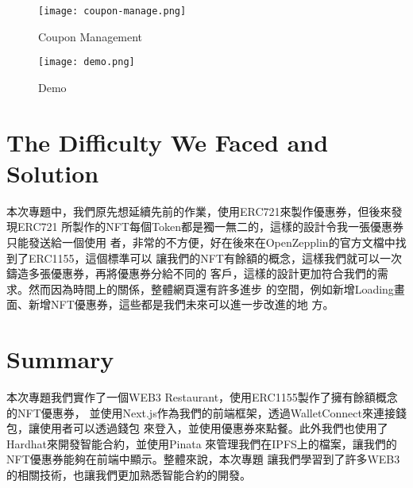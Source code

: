 \begin{figure}[H]
  \centering
  \texttt{[image: coupon-manage.png]}
  \caption{Coupon Management}
  \label{fig:coupon-manage}
\end{figure}

\begin{figure}[H]
  \centering
  \texttt{[image: demo.png]}
  \caption{Demo}
  \label{fig:demo}
\end{figure}

\section{The Difficulty We Faced and Solution}

本次專題中，我們原先想延續先前的作業，使用ERC721來製作優惠券，但後來發現ERC721
所製作的NFT每個Token都是獨一無二的，這樣的設計令我一張優惠券只能發送給一個使用
者，非常的不方便，好在後來在OpenZepplin的官方文檔中找到了ERC1155，這個標準可以
讓我們的NFT有餘額的概念，這樣我們就可以一次鑄造多張優惠券，再將優惠券分給不同的
客戶，這樣的設計更加符合我們的需求。然而因為時間上的關係，整體網頁還有許多進步
的空間，例如新增Loading畫面、新增NFT優惠券，這些都是我們未來可以進一步改進的地
方。

\section{Summary}

本次專題我們實作了一個WEB3 Restaurant，使用ERC1155製作了擁有餘額概念的NFT優惠券，
並使用Next.js作為我們的前端框架，透過WalletConnect來連接錢包，讓使用者可以透過錢包
來登入，並使用優惠券來點餐。此外我們也使用了Hardhat來開發智能合約，並使用Pinata
來管理我們在IPFS上的檔案，讓我們的NFT優惠券能夠在前端中顯示。整體來說，本次專題
讓我們學習到了許多WEB3的相關技術，也讓我們更加熟悉智能合約的開發。
